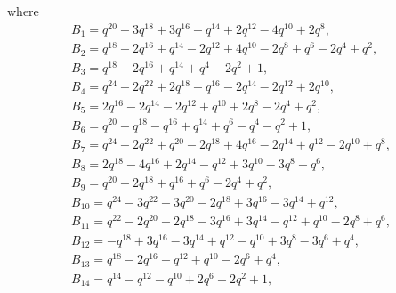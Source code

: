 \documentclass[pdftex]{sigma}
\numberwithin{equation}{section}
\theoremstyle{definition}
\newcommand{\flac}[2]{#1}
\begin{document}
where
\begin{gather*}
 B_1 =
\flac{q^{20}}{a^2}-\flac{3q^{18}}{a^2}+\flac{3q^{16}}{a^2}-\flac{q^{14}}{a^2}+\flac{2q^{12}}{a^2}-\flac{4q^{10}}{a^2}+\flac{2q^{8}}{a^2}, \\
 B_2 =
\flac{q^{18}}{a^2}-\flac{2q^{16}}{a^2}+\flac{q^{14}}{a^2}-\flac{2q^{12}}{a^2}+\flac{4q^{10}}{a^2}-\flac{2q^{8}}{a^2}+\flac{q^{6}}{a^2}-\flac{2q^{4}}{a^2}+\flac{q^{2}}{a^2}, \\
 B_3 =
\flac{q^{18}}{a^2}-\flac{2q^{16}}{a^2}+\flac{q^{14}}{a^2}+\flac{q^{4}}{a^2}-\flac{2q^{2}}{a^2}+\flac{1}{a^2}, \\
 B_4 =
\flac{q^{24}}{a^2}-\flac{2q^{22}}{a^2}+\flac{2q^{18}}{a^2}+\flac{q^{16}}{a^2}-\flac{2q^{14}}{a^2}-\flac{2q^{12}}{a^2}+\flac{2q^{10}}{a^2}, \\
 B_5 =
\flac{2q^{16}}{a^2}-\flac{2q^{14}}{a^2}-\flac{2q^{12}}{a^2}+\flac{q^{10}}{a^2}+\flac{2q^{8}}{a^2}-\flac{2q^{4}}{a^2}+\flac{q^{2}}{a^2},\\
 B_6 =
\flac{q^{20}}{a^2}-\flac{q^{18}}{a^2}-\flac{q^{16}}{a^2}+\flac{q^{14}}{a^2}+\flac{q^{6}}{a^2}-\flac{q^{4}}{a^2}-\flac{q^{2}}{a^2}+\flac{1}{a^2}, \\
 B_7 =
\flac{q^{24}}{a^2}-\flac{2q^{22}}{a^2}+\flac{q^{20}}{a^2}-\flac{2q^{18}}{a^2}+\flac{4q^{16}}{a^2}-\flac{2q^{14}}{a^2}+\flac{q^{12}}{a^2}-\flac{2q^{10}}{a^2}+\flac{q^{8}}{a^2}, \\
 B_8 =
\flac{2q^{18}}{a^2}-\flac{4q^{16}}{a^2}+\flac{2q^{14}}{a^2}-\flac{q^{12}}{a^2}+\flac{3q^{10}}{a^2}-\flac{3q^{8}}{a^2}+\flac{q^{6}}{a^2}, \\
 B_9 =
\flac{q^{20}}{a^2}-\flac{2q^{18}}{a^2}+\flac{q^{16}}{a^2}+\flac{q^{6}}{a^2}-\flac{2q^{4}}{a^2}+\flac{q^{2}}{a^2}, \\
 B_{10} =
\flac{q^{24}}{a^2}-\flac{3q^{22}}{a^2}+\flac{3q^{20}}{a^2}-\flac{2q^{18}}{a^2}+\flac{3q^{16}}{a^2}-\flac{3q^{14}}{a^2}+\flac{q^{12}}{a^2}, \\
 B_{11} =
\flac{q^{22}}{a^2}-\flac{2q^{20}}{a^2}+\flac{2q^{18}}{a^2}-\flac{3q^{16}}{a^2}+\flac{3q^{14}}{a^2}-\flac{q^{12}}{a^2}+\flac{q^{10}}{a^2}-\flac{2q^{8}}{a^2}+\flac{q^{6}}{a^2},\\
 B_{12} =
-\flac{q^{18}}{a^2}+\flac{3q^{16}}{a^2}-\flac{3q^{14}}{a^2}+\flac{q^{12}}{a^2}-\flac{q^{10}}{a^2}+\flac{3q^{8}}{a^2}-\flac{3q^{6}}{a^2}+\flac{q^{4}}{a^2}, \\
 B_{13} =
\flac{q^{18}}{a^2}-\flac{2q^{16}}{a^2}+\flac{q^{12}}{a^2}+\flac{q^{10}}{a^2}-\flac{2q^{6}}{a^2}+\flac{q^{4}}{a^2}, \\
 B_{14} =
\flac{q^{14}}{a^2}-\flac{q^{12}}{a^2}-\flac{q^{10}}{a^2}+\flac{2q^{6}}{a^2}-\flac{2q^{2}}{a^2}+\flac{1}{a^2}, \\

\end{gather*}
\end{document}
